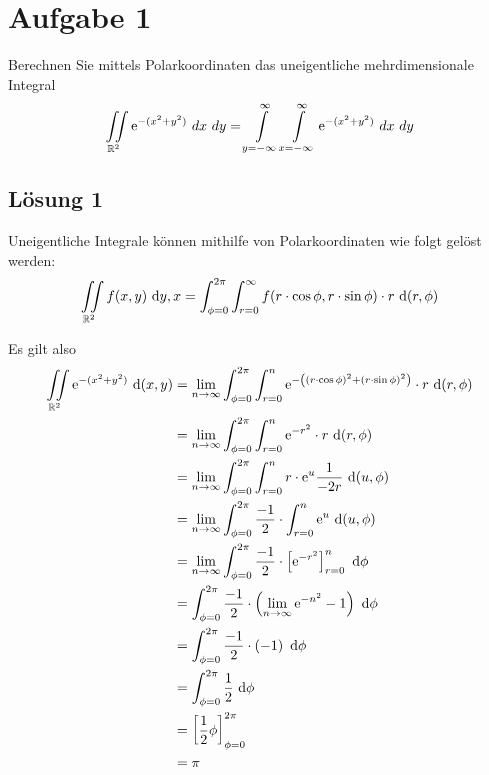 \documentclass[main.tex]{subfiles}
\begin{document}
\section{Aufgabe 1}
Berechnen Sie mittels Polarkoordinaten das uneigentliche mehrdimensionale Integral
\[
\iint \limits_{\mathbb{R}^2} \mathrm{e}^{-(x^2 + y^2)} \ dx \ dy
   = \int \limits_{y = -\infty}^{\infty} \int \limits_{x=-\infty}^{\infty} 
		\mathrm{e}^{-(x^2 + y^2)} \ dx \ dy
\]

\subsection{Lösung 1}

Uneigentliche Integrale können mithilfe von Polarkoordinaten wie folgt gelöst werden:
\begin{align*}
    \iint \limits_{\mathbb{R}^2} 
        f(x,y) ~\mathrm{d}y,x = \int_{\phi=0}^{2\pi} \int_{r=0}^{\infty} f(r\cdot \cos \phi, r\cdot \sin \phi) \cdot r 
    ~\mathrm{d}(r,\phi) \\
\end{align*} 

Es gilt also
\begin{align*}
    \iint \limits_{\mathbb{R}^2} \mathrm{e}^{-(x^2 + y^2)} ~\mathrm{d}(x,y)
    &= \lim_{n \to \infty} \int_{\phi=0}^{2\pi} \int_{r=0}^{n} \mathrm{e}^{-\left((r\cdot \cos \phi)^2 + (r\cdot \sin \phi)^2\right)} \cdot r ~\mathrm{d}(r,\phi) \\
    &= \lim_{n \to \infty} \int_{\phi=0}^{2\pi} \int_{r=0}^{n} \mathrm{e}^{-r^2} \cdot r ~\mathrm{d}(r,\phi) \\
    &= \lim_{n \to \infty} \int_{\phi=0}^{2\pi} \int_{r=0}^{n} r\cdot \mathrm{e}^{u} \frac{1}{-2r} ~\mathrm{d}(u,\phi) \\
    &= \lim_{n \to \infty} \int_{\phi=0}^{2\pi} \frac{-1}{2} \cdot \int_{r=0}^{n} \mathrm{e}^{u} ~\mathrm{d}(u,\phi) \\
    &= \lim_{n \to \infty} \int_{\phi=0}^{2\pi} \frac{-1}{2} \cdot \left[ \mathrm{e}^{-r^2} \right]_{r=0}^{n} ~\mathrm{d}\phi \\
    &= \int_{\phi=0}^{2\pi} \frac{-1}{2} \cdot \left( \lim_{n \to \infty} \mathrm{e}^{-n^2} - 1 \right) ~\mathrm{d}\phi \\
    &= \int_{\phi=0}^{2\pi} \frac{-1}{2} \cdot \left( - 1 \right) ~\mathrm{d}\phi \\
    &= \int_{\phi=0}^{2\pi} \frac{1}{2} ~\mathrm{d}\phi \\
    &= \left[ \frac{1}{2}\phi \right]_{\phi=0}^{2\pi} \\
    &= \pi \\
\end{align*}
\end{document}
